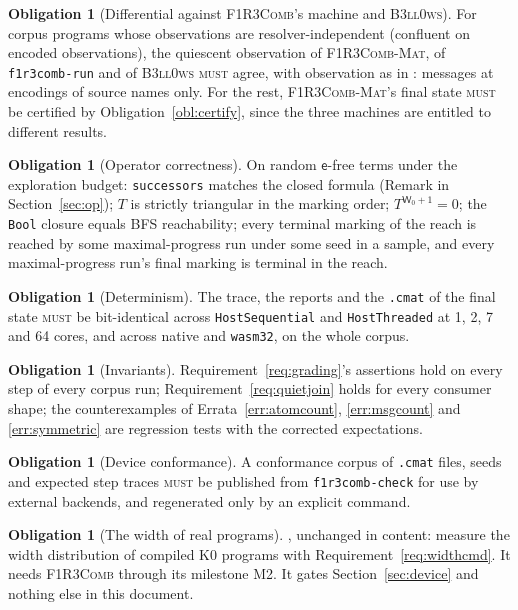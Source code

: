 \documentclass[11pt,a4paper]{article}
\newcommand{\code}[1]{\texttt{#1}}
\newcommand{\Comb}{\textsc{F1R3Comb}}
\newcommand{\Mat}{\textsc{F1R3Comb-Mat}}
\newcommand{\Bell}{\textsc{B3ll0ws}}
\newcommand{\MUST}{\textsc{must}}
\newcommand{\ev}{\mathsf{e}}
\newcommand{\Wt}{\mathsf{W}}
\theoremstyle{definition}
\newtheorem{obligation}[definition]{Obligation}
\theoremstyle{plain}
\begin{document}
\begin{obligation}[Differential against \Comb's machine and \Bell]
\label{obl:diff}
For corpus programs whose observations are resolver-independent (confluent
on encoded observations), the quiescent observation of \Mat{}, of
\code{f1r3comb-run} and of \Bell{} \MUST{} agree, with observation as in
\cite[Obl.~10.4]{combspec}: messages at encodings of source names only. For
the rest, \Mat's final state \MUST{} be certified by
Obligation~\ref{obl:certify}, since the three machines are entitled to
different results.
\end{obligation}

\begin{obligation}[Operator correctness]\label{obl:op}
On random $\ev$-free terms under the exploration budget: \code{successors}
matches the closed formula (Remark in Section~\ref{sec:op}); $T$ is strictly
triangular in the marking order; $T^{\Wt_{0}+1} = 0$; the \code{Bool} closure
equals BFS reachability; every terminal marking of the reach is reached by
some maximal-progress run under some seed in a sample, and every
maximal-progress run's final marking is terminal in the reach.
\end{obligation}

\begin{obligation}[Determinism]\label{obl:det}
The trace, the reports and the \code{.cmat} of the final state \MUST{} be
bit-identical across \code{HostSequential} and \code{HostThreaded} at 1, 2,
7 and 64 cores, and across native and \code{wasm32}, on the whole corpus.
\end{obligation}

\begin{obligation}[Invariants]\label{obl:inv}
Requirement~\ref{req:grading}'s assertions hold on every step of every
corpus run; Requirement~\ref{req:quietjoin} holds for every consumer shape;
the counterexamples of Errata~\ref{err:atomcount}, \ref{err:msgcount} and
\ref{err:symmetric} are regression tests with the corrected expectations.
\end{obligation}

\begin{obligation}[Device conformance]\label{obl:devconf}
A conformance corpus of \code{.cmat} files, seeds and expected step traces
\MUST{} be published from \code{f1r3comb-check} for use by external
backends, and regenerated only by an explicit command.
\end{obligation}

\begin{obligation}[The width of real programs]\label{obl:width}
\cite[Obl.~13.7]{matnote}, unchanged in content: measure the width
distribution of compiled K0 programs with Requirement~\ref{req:widthcmd}. It
needs \Comb{} through its milestone M2. It gates Section~\ref{sec:device} and
nothing else in this document.
\end{obligation}
\end{document}
